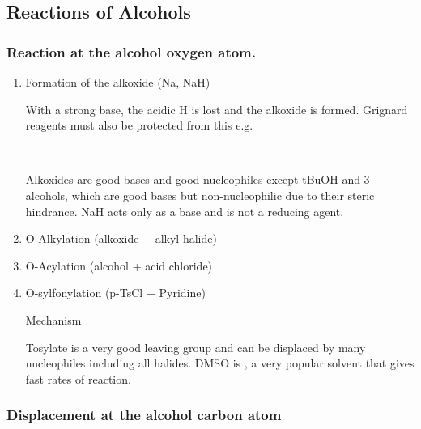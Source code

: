 \subsection{Reactions of Alcohols}

\subsubsection{Reaction at the alcohol oxygen atom.}

\begin{enumerate}[label=\alph*)]

  \item Formation of the alkoxide (Na, NaH)

    With a strong base, the acidic H is lost and the alkoxide is formed.
    Grignard reagents must also be protected from this e.g.

    \begin{center}
      \\
    \end{center}

    Alkoxides are good bases and good nucleophiles except tBuOH and
    3\super{$\circ$} alcohols, which are good bases but non-nucleophilic due
    to their steric hindrance. NaH acts only as a base and is not a reducing
    agent.

  \item O-Alkylation (alkoxide + alkyl halide)


  \item O-Acylation (alcohol + acid chloride)


  \item O-sylfonylation (p-TsCl + Pyridine)

    Mechanism

    Tosylate is a very good leaving group and can be displaced by many
    nucleophiles including all halides.
    DMSO is , a very popular solvent that gives fast rates of reaction.

\end{enumerate}

\subsubsection{Displacement at the alcohol carbon atom}

